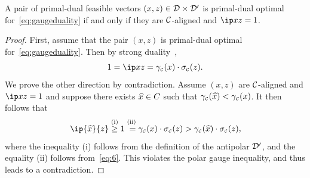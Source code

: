\begin{proposition} \label{prop:polar-duality}
  A pair of primal-dual feasible vectors
    $(x,z)\in\mathcal{D}\times\mathcal{D}'$ is primal-dual optimal
    for~\eqref{eq:gaugeduality} if and only if they are
    $\mathcal{C}$-aligned and $\ip x z = 1$.
\end{proposition}

\begin{proof}
  First, assume that the pair $(x,z)$ is primal-dual optimal
  for~\eqref{eq:gaugeduality}. Then by strong
  duality~\cite[Corollary~5.2]{friedlander2014gauge},
  \begin{equation} \label{eq:6}
    1 = \ip x z = \gauge\Cs(x)\cdot\sigma\Cs(z).
  \end{equation}
  We prove the other direction by contradiction. Assume $(x,z)$ are
  $\mathcal{C}$-aligned and $\ip x z = 1$ and suppose there exists $\xhat \in C$ such
  that $\gauge\Cs(\xhat) < \gauge\Cs(x)$. It then follows that
  \[
    \ip{\xhat}{z} \overset{\rm(i)}{\geq} 1 
    \overset{\rm(ii)}{\vphantom{\ge}=} \gauge\Cs(x)\cdot\sigma\Cs(z) > \gauge\Cs(\xhat )\cdot\sigma\Cs(z),\]
  where the inequality (i) follows from the definition of the
  antipolar $\mathcal{D}'$, and the equality (ii) follows
  from~\eqref{eq:6}. This violates the polar gauge inequality, and
  thus leads to a contradiction.
\end{proof}

